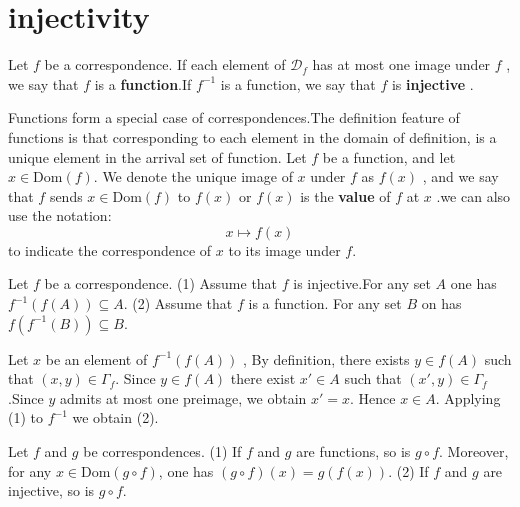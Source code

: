 \documentclass{book}
\numberwithin{equation}{section}
\begin{document}
\section{injectivity}
\begin{definitionenv}
    Let $f$ be a correspondence. If each element of $\mathscr{D}_f$ has at most one image under $f$ ,  we say that $f$ is a \textbf{function}.If $f^{-1}$ is a function,  we say that $f$ is \textbf{injective} .
\end{definitionenv}
\begin{notationenv}
    Functions form a special case of correspondences.The definition feature of functions is that corresponding to each element in the domain of definition,  is a unique element in the arrival set of function.
    \newline
    Let $f$ be a function, and let $x\in \mathrm{Dom}(f)$. We denote the unique image of $x$ under $f$ as $f(x)$ , and we say that $f$ sends $x\in \mathrm{Dom}(f)$ to $f(x)$ or $f(x)$  is the \textbf{value} of $f$ at $x$ .we can also use the notation:
    $$x\mapsto f(x)$$
    to indicate the correspondence of $x$ to its image under $f$.
\end{notationenv}
\begin{propositionenv}\label{proposition3.6.1}
    Let $f$ be a correspondence.
    \newline
    (1) Assume that $f$ is injective.For any set $A$ one has $f^{-1}(f(A))\subseteq A$.
    \newline
    (2) Assume that $f$ is a function. For any set $B$ on has $f(f^{-1}(B))\subseteq B$. 
\end{propositionenv}
\begin{proofenv}
    Let $x$ be an element of $f^{-1}(f(A))$ , By definition, there exists $y\in f(A)$ such that $(x, y)\in \Gamma_f$. Since $y\in f(A) $ there exist $x'\in A$ such that $(x', y)\in \Gamma_f$.Since $y$ admits at most one preimage,  we obtain $x'=x$. Hence $x\in A$.
    \newline
    Applying (1) to $f^{-1}$ we obtain (2).
\end{proofenv}
\begin{propositionenv}\label{proposition3.6.2}
    Let \( f \) and \( g \) be correspondences.
\newline
    (1) If \( f \) and \( g \) are functions,  so is \( g \circ f \). Moreover,  for any \( x \in \text{Dom}(g \circ f) \),  one has \((g \circ f)(x) = g(f(x))\).
    \newline
    (2) If \( f \) and \( g \) are injective,  so is \( g \circ f \).

\end{propositionenv}
\end{document}
